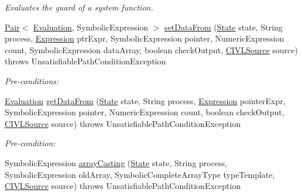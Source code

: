 \begin{DoxyCompactItemize}
\begin{DoxyCompactList}\small\item\em Evaluates the guard of a system function. \end{DoxyCompactList}\item 
\hyperlink{classedu_1_1udel_1_1cis_1_1vsl_1_1civl_1_1util_1_1IF_1_1Pair}{Pair}$<$ \hyperlink{classedu_1_1udel_1_1cis_1_1vsl_1_1civl_1_1semantics_1_1IF_1_1Evaluation}{Evaluation}, Symbolic\+Expression $>$ \hyperlink{classedu_1_1udel_1_1cis_1_1vsl_1_1civl_1_1library_1_1common_1_1BaseLibraryEvaluator_ad3c18fce2a6da1a036823e89f7aae1b5}{set\+Data\+From} (\hyperlink{interfaceedu_1_1udel_1_1cis_1_1vsl_1_1civl_1_1state_1_1IF_1_1State}{State} state, String process, \hyperlink{interfaceedu_1_1udel_1_1cis_1_1vsl_1_1civl_1_1model_1_1IF_1_1expression_1_1Expression}{Expression} ptr\+Expr, Symbolic\+Expression pointer, Numeric\+Expression count, Symbolic\+Expression data\+Array, boolean check\+Output, \hyperlink{interfaceedu_1_1udel_1_1cis_1_1vsl_1_1civl_1_1model_1_1IF_1_1CIVLSource}{C\+I\+V\+L\+Source} source)  throws Unsatisfiable\+Path\+Condition\+Exception 
\begin{DoxyCompactList}\small\item\em Pre-\/conditions\+: \end{DoxyCompactList}\item 
\hyperlink{classedu_1_1udel_1_1cis_1_1vsl_1_1civl_1_1semantics_1_1IF_1_1Evaluation}{Evaluation} \hyperlink{classedu_1_1udel_1_1cis_1_1vsl_1_1civl_1_1library_1_1common_1_1BaseLibraryEvaluator_aabc7605e7fa536b1e4620849029e4a1e}{get\+Data\+From} (\hyperlink{interfaceedu_1_1udel_1_1cis_1_1vsl_1_1civl_1_1state_1_1IF_1_1State}{State} state, String process, \hyperlink{interfaceedu_1_1udel_1_1cis_1_1vsl_1_1civl_1_1model_1_1IF_1_1expression_1_1Expression}{Expression} pointer\+Expr, Symbolic\+Expression pointer, Numeric\+Expression count, boolean check\+Output, \hyperlink{interfaceedu_1_1udel_1_1cis_1_1vsl_1_1civl_1_1model_1_1IF_1_1CIVLSource}{C\+I\+V\+L\+Source} source)  throws Unsatisfiable\+Path\+Condition\+Exception 
\begin{DoxyCompactList}\small\item\em Pre-\/condition\+: \end{DoxyCompactList}\item 
Symbolic\+Expression \hyperlink{classedu_1_1udel_1_1cis_1_1vsl_1_1civl_1_1library_1_1common_1_1BaseLibraryEvaluator_acf6ae2d4328db9ce152c57643c34e96a}{array\+Casting} (\hyperlink{interfaceedu_1_1udel_1_1cis_1_1vsl_1_1civl_1_1state_1_1IF_1_1State}{State} state, String process, Symbolic\+Expression old\+Array, Symbolic\+Complete\+Array\+Type type\+Template, \hyperlink{interfaceedu_1_1udel_1_1cis_1_1vsl_1_1civl_1_1model_1_1IF_1_1CIVLSource}{C\+I\+V\+L\+Source} source)  throws Unsatisfiable\+Path\+Condition\+Exception 

\end{DoxyCompactItemize}
